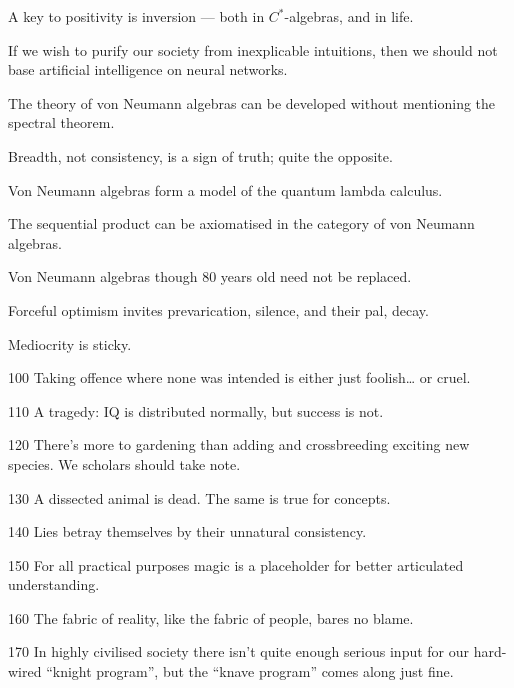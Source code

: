 \documentclass[b5paper]{book}
\begin{document}
\begin{parsec}{10}%
A key to positivity is inversion --- both in  $C^*$-algebras,
and in life.
\end{parsec}
\begin{parsec}{20}
If we wish to purify our society from inexplicable intuitions,
then we should not base artificial intelligence on neural networks.
\end{parsec}
\begin{parsec}{30}%
The theory of von Neumann algebras
can be developed without mentioning
the spectral theorem.
\end{parsec}
\begin{parsec}{40}%
Breadth, not consistency, is a sign of truth;
quite the opposite.
\end{parsec}
\begin{parsec}{50}
Von Neumann algebras form a model of the quantum lambda calculus.
\end{parsec}
\begin{parsec}{60}
The sequential product can be axiomatised in the category of von Neumann
algebras.
\end{parsec}
\begin{parsec}{70}%
Von Neumann algebras
though 80 years old
need not be replaced.
\end{parsec}
\begin{parsec}{80}%
Forceful optimism
invites prevarication, silence,
and their pal, decay.
\end{parsec}
\begin{parsec}{90}%
Mediocrity is sticky.
\end{parsec}
\begin{parsec}{100}%
Taking offence where none was intended
is either just foolish\dots{} or cruel.
\end{parsec}
\begin{parsec}{110}%
A tragedy:
IQ is distributed normally,
but success is not.
\end{parsec}
\begin{parsec}{120}%
There's more to gardening
than adding and crossbreeding exciting new species.
We scholars should take note.
\end{parsec}
\begin{parsec}{130}%
A dissected animal is dead.
The same is true for concepts.
\end{parsec}
\begin{parsec}{140}%
Lies betray themselves by their
unnatural consistency.
\end{parsec}
\begin{parsec}{150}%
For all practical purposes
magic is a placeholder for better
articulated understanding.
\end{parsec}
\begin{parsec}{160}%
The fabric
of reality,
like the fabric of people,
bares no blame.
\end{parsec}
\begin{parsec}{170}%
In highly civilised society
there isn't quite enough serious input
for our hard-wired ``knight program'',
but the ``knave program'' comes along just fine.
\end{parsec}
\end{document}

